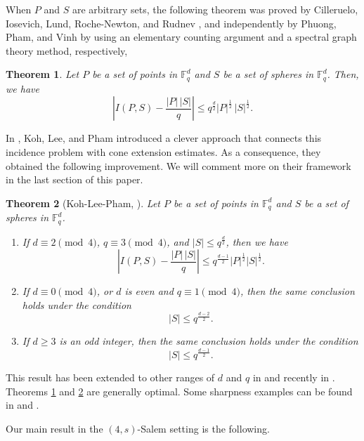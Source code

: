 \documentclass{article}
\newtheorem{theorem}{Theorem}[section]
\begin{document}
When $P$ and $S$ are arbitrary sets, the following theorem was proved by Cilleruelo, Iosevich, Lund, Roche-Newton, and Rudnev \cite{CILRR}, and independently by Phuong, Pham, and Vinh \cite{PPV} by using an elementary counting argument and a spectral graph theory method, respectively,


\begin{theorem}\label{Thm-incidence-spheres}
    Let $P$ be a set of points in $\mathbb{F}_q^d$ and $S$ be a set of spheres in $\mathbb{F}_q^d$. Then, we have 
    \[ \left|I(P,S)-\frac{|P| \, |S|}{q} \right| \leq q^{\frac{d}{2}} |P|^{\frac{1}{2}} \, |S|^{\frac{1}{2}}.\]
\end{theorem}


In \cite{KLP22}, Koh, Lee, and Pham introduced a clever approach that connects this incidence problem with cone extension estimates. As a consequence, they obtained the following improvement. We will comment more on their framework in the last section of this paper.
\begin{theorem}[Koh-Lee-Pham, \cite{KLP22}]\label{Thm-incidence-Q-spheres}
Let $P$ be a set of points in $\mathbb{F}_q^d$ and $S$ be a set of spheres in $\mathbb{F}_q^d$. 
\begin{enumerate}
\item[(i)]
If $d \equiv 2 \pmod{4}$, $q \equiv 3 \pmod{4}$, and
$|S| \le q^{\frac{d}{2}}$, then we have
\[
\left|
I(P,S)
-
\frac{|P| \, |S|}{q}
\right|
\le
q^{\frac{d-1}{2}}
|P|^{\frac12}|S|^{\frac{1}{2}}.
\]

\item[(ii)]
If $d \equiv 0 \pmod{4}$, or $d$ is even and $q \equiv 1 \pmod{4}$, then the same conclusion holds under the condition
\[
|S| \le q^{\frac{d-2}{2}}.
\]

\item[(iii)]
If $d \ge 3$ is an odd integer, then the same conclusion holds under the condition
\[
|S| \le q^{\frac{d-1}{2}}.
\]
\end{enumerate}
\end{theorem}

This result has been extended to other ranges of $d$ and $q$ in \cite{Kohpham} and recently in \cite{KLXY25}. Theorems \ref{Thm-incidence-spheres} and \ref{Thm-incidence-Q-spheres} are generally optimal. Some sharpness examples can be found in \cite{KLP22} and \cite{KLXY25}.


Our main result in the $(4, s)$-Salem setting is the following.

\end{document}
